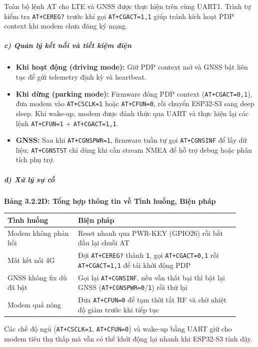\documentclass[13pt,a4paper]{extarticle}
\newcounter{none} %
\newcommand{\thesislongtableorignewline}{}
\let\thesislongtableorignewline\\
\renewcommand{\\}{\thesislongtableorignewline\hline}%
\let\\\thesislongtableorignewline
\newcommand{\thesistabletitle}[1]{%
  \begin{center}\textbf{#1}\end{center}%
}
\providecommand{\tightlist}{%
  \setlength{\itemsep}{0pt}\setlength{\parskip}{0pt}}
\begin{document}
Toàn bộ lệnh AT cho LTE và GNSS được thực hiện trên cùng UART1. Trình tự
kiểm tra \texttt{AT+CEREG?} trước khi gọi \texttt{AT+CGACT=1,1} giúp
tránh kích hoạt PDP context khi modem chưa đăng ký mạng.

\subparagraph{c) Quản lý kết nối và tiết kiệm
điện}\label{c-quux1ea3n-luxfd-kux1ebft-nux1ed1i-vuxe0-tiux1ebft-kiux1ec7m-ux111iux1ec7n}

\begin{itemize}
\tightlist
\item
  \textbf{Khi hoạt động (driving mode):} Giữ PDP context mở và GNSS bật
  liên tục để gửi telemetry định kỳ và heartbeat.
\item
  \textbf{Khi dừng (parking mode):} Firmware đóng PDP context
  (\texttt{AT+CGACT=0,1}), đưa modem vào \texttt{AT+CSCLK=1} hoặc
  \texttt{AT+CFUN=0}, rồi chuyển ESP32-S3 sang deep sleep. Khi wake-up,
  modem được đánh thức qua UART và thực hiện lại các lệnh
  \texttt{AT+CFUN=1} + \texttt{AT+CGACT=1,1}.
\item
  \textbf{GNSS:} Sau khi \texttt{AT+CGNSPWR=1}, firmware tuần tự gọi
  \texttt{AT+CGNSINF} để lấy dữ liệu; \texttt{AT+CGNSTST} chỉ dùng khi
  cần stream NMEA để hỗ trợ debug hoặc phân tích phụ trợ.
\end{itemize}

\subparagraph{d) Xử lý sự cố}\label{d-xux1eed-luxfd-sux1ef1-cux1ed1}

{\def\LTcaptype{none} %
\thesistabletitle{Bảng 3.2.2D: Tổng hợp thông tin về Tình huống, Biện pháp}

\begin{longtable}{|p{0.28\linewidth}|p{0.64\linewidth}|}
\hline \textbf{Tình huống} & \textbf{Biện pháp} \\
\hline
\endhead
\hline
\endlastfoot
Modem không phản hồi & Reset nhanh qua PWR-KEY (GPIO26) rồi bắt đầu lại
chuỗi AT \\
Mất kết nối 4G & Đợi \texttt{AT+CEREG?} thành \texttt{1}, gọi
\texttt{AT+CGACT=0,1} rồi \texttt{AT+CGACT=1,1} để tái khởi động PDP \\
GNSS không fix dù đã bật & Gọi lại \texttt{AT+CGNSINF}, nếu vẫn thất bại
thì bật lại GNSS (\texttt{AT+CGNSPWR=0}/\texttt{1}) rồi thử lại \\
Modem quá nóng & Đưa \texttt{AT+CFUN=0} để tạm thời tắt RF và chờ nhiệt
độ giảm trước khi tiếp tục \\
\end{longtable}
}

Các chế độ ngủ (\texttt{AT+CSCLK=1}, \texttt{AT+CFUN=0}) và wake-up bằng
UART giữ cho modem tiêu thụ thấp mà vẫn có thể khởi động lại nhanh khi
ESP32-S3 tỉnh dậy.
\end{document}
